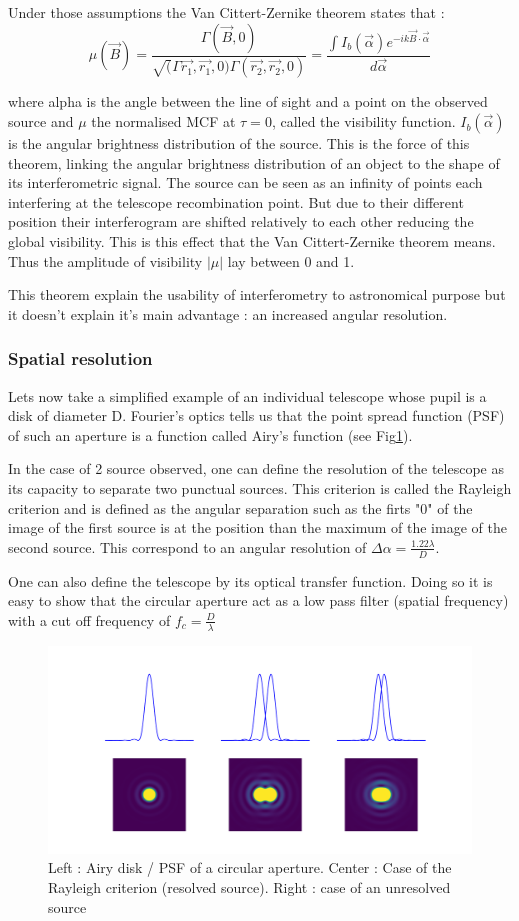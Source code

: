 Under those assumptions the Van Cittert-Zernike theorem states that :
$$
\mu(\vec{B}) = \frac{\Gamma(\vec{B},0)}{\sqrt(\Gamma{\vec{r_1},\vec{r_1},0)\Gamma(\vec{r_2},\vec{r_2},0)}} = \frac{\int I_b(\vec{\alpha}) e^{-ik\vec{B} \cdot \vec{\alpha}}}{d\vec{\alpha}}
$$

where alpha is the angle between the line of sight and a point on the observed source and $\mu$ the normalised MCF at $\tau=0$, called the visibility function. $I_b(\vec{\alpha})$ is the angular brightness distribution of the source. This is the force of this theorem, linking the angular brightness distribution of an object to the shape of its interferometric signal. The source can be seen as an infinity of points each interfering at the telescope recombination point. But due to their different position their interferogram are shifted relatively to each other reducing the global visibility. This is this effect that the Van Cittert-Zernike theorem means. Thus the amplitude of visibility $\left| \mu \right|$ lay between 0 and 1.

This theorem explain the usability of interferometry to astronomical purpose but it doesn't explain it's main advantage : an increased angular resolution. 

	\subsubsection{Spatial resolution}
Lets now take a simplified example of an individual telescope whose pupil is a disk of diameter D. Fourier's optics tells us that the point spread function (PSF) of such an aperture is a function called Airy's function (see Fig\ref{fig:airy}). 

In the case of 2 source observed, one can define the resolution of the telescope as its capacity to separate two punctual sources. This criterion is called the Rayleigh criterion and is defined as the angular separation such as the firts "0" of the image of the first source is at the position than the maximum of the image of the second source. This correspond to an angular resolution of $\Delta \alpha = \frac{1.22\lambda}{D}$. 

One can also define the telescope by its optical transfer function. Doing so it is easy to show that the circular aperture act as a low pass filter (spatial frequency) with a cut off frequency of $f_c = \frac{D}{\lambda}$


\begin{figure}[htbp!]
\centering
\includegraphics[scale=.3]{../picture/airy.pdf}
\caption{Left : Airy disk / PSF of a circular aperture. Center : Case of the Rayleigh criterion (resolved source). Right : case of an unresolved source}
\label{fig:airy}
\end{figure}